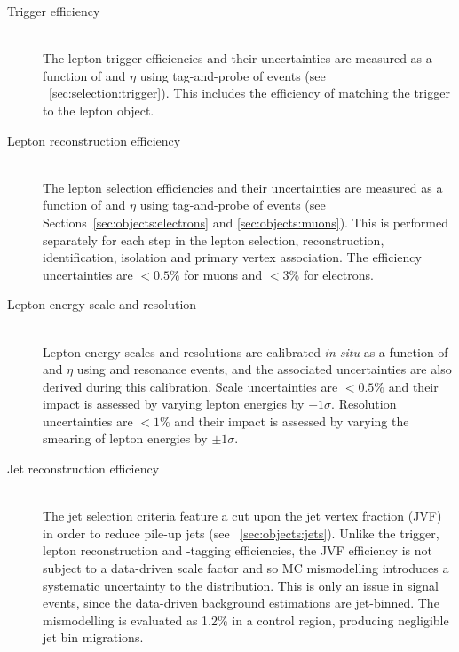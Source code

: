 \begin{description}
\item[Trigger efficiency] \hfill \\
	The lepton trigger efficiencies and their uncertainties are measured as a function of 
	\pt and $\eta$ using tag-and-probe of \HepProcess{\PZ \HepTo \Plepton\Plepton} events 
	(see \Section~\ref{sec:selection:trigger}). This includes the efficiency of matching the 
	trigger to the lepton object.
	
\item[Lepton reconstruction efficiency] \hfill \\
	The lepton selection efficiencies and their uncertainties are measured as a function of 
	\pt and $\eta$ using tag-and-probe of \HepProcess{\PZ \HepTo \Plepton\Plepton} events 
	(see Sections~\ref{sec:objects:electrons} and \ref{sec:objects:muons}). This is 
	performed separately for each step in the lepton selection, \ie reconstruction, 
	identification, isolation and primary vertex association. The efficiency uncertainties 
	are $<\!0.5\%$ for muons and $<\!3\%$ for electrons.
	
\item[Lepton energy scale and resolution] \hfill \\
	Lepton energy scales and resolutions are calibrated \textit{in situ} as a function of 
	\pt and $\eta$ using \HepProcess{\PJpsi \HepTo \Plepton\Plepton} and \HepProcess{\PZ 
	\HepTo \Plepton\Plepton} resonance events, and the associated uncertainties are also 
	derived during this calibration. Scale uncertainties are $<\!0.5\%$ and their impact 
	is assessed by varying lepton energies by $\pm1\sigma$. Resolution uncertainties are 
	$<\!1\%$ and their impact is assessed by varying the smearing of lepton energies by 
	$\pm1\sigma$.

\item[Jet reconstruction efficiency] \hfill \\
	The jet selection criteria feature a cut upon the jet vertex fraction (JVF) in order to 
	reduce pile-up jets (see \Section~\ref{sec:objects:jets}). Unlike the trigger, lepton 
	reconstruction and \Pbottom-tagging efficiencies, the JVF efficiency is not subject to 
	a data-driven scale factor and so MC mismodelling introduces a systematic uncertainty to 
	the \njets distribution. This is only an issue in signal events, since the data-driven 
	background estimations are jet-binned. The mismodelling is evaluated as 1.2\% in a \DYll 
	control region, producing negligible jet bin migrations.


\end{description}

